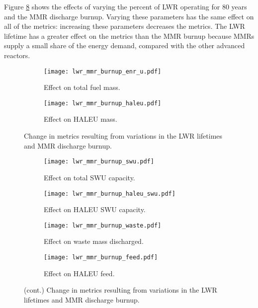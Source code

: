 Figure \ref{fig:lwr_mmr_burnup} shows the effects of varying the percent 
of \gls{LWR} operating for 80 years and the \gls{MMR} discharge burnup. 
Varying these parameters has the same effect on all of the metrics: 
increasing these parameters decreases the metrics. The \gls{LWR} lifetime 
has a greater effect on the metrics than the \gls{MMR} burnup because 
\glspl{MMR} supply a small share of the energy demand, compared with 
the other advanced reactors. 
\begin{figure}
    \begin{subfigure}[h!]{0.48\textwidth}
        \centering
        \texttt{[image: lwr\_mmr\_burnup\_enr\_u.pdf]}
        \caption{Effect on total fuel mass.}
        \label{fig:lwr_mmr_burnup__enr_u}
    \end{subfigure}
    \hfill
    \begin{subfigure}[h!]{0.48\textwidth}
        \centering
        \texttt{[image: lwr\_mmr\_burnup\_haleu.pdf]}
        \caption{Effect on HALEU mass.}
        \label{fig:lwr_mmr_burnup_haleu}
    \end{subfigure}
    \caption{Change in metrics resulting from variations in the 
    LWR lifetimes and MMR discharge burnup.}
\end{figure}

\begin{figure}
    \ContinuedFloat    
    \begin{subfigure}[h!]{0.48\textwidth}
        \centering
        \texttt{[image: lwr\_mmr\_burnup\_swu.pdf]}
        \caption{Effect on total SWU capacity.}
        \label{fig:lwr_mmr_burnup_swu}
    \end{subfigure}
    \hfill
    \begin{subfigure}[h!]{0.48\textwidth}
        \centering
        \texttt{[image: lwr\_mmr\_burnup\_haleu\_swu.pdf]}
        \caption{Effect on HALEU SWU capacity.}
        \label{fig:lwr_mmr_burnup_haleu_swu}
    \end{subfigure}
    
    \begin{subfigure}[h!]{0.48\textwidth}
        \centering
        \texttt{[image: lwr\_mmr\_burnup\_waste.pdf]}
        \caption{Effect on waste mass discharged.}
        \label{fig:lwr_mmr_burnup_waste}
    \end{subfigure}
    \hfill
    \begin{subfigure}[h!]{0.48\textwidth}
        \centering
        \texttt{[image: lwr\_mmr\_burnup\_feed.pdf]}
        \caption{Effect on HALEU feed.}
        \label{fig:lwr_mmr_burnup_feed}
    \end{subfigure}
    \caption{(cont.) Change in metrics resulting from variations in the 
    LWR lifetimes and MMR discharge burnup.}
    \label{fig:lwr_mmr_burnup}
\end{figure}

